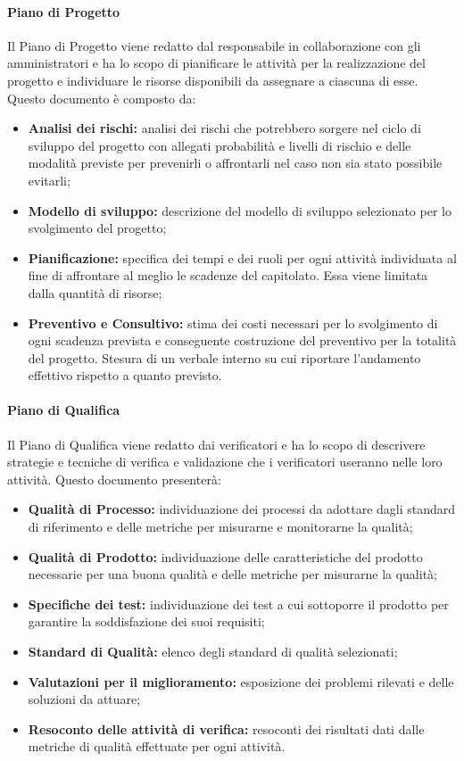 \paragraph{Piano di Progetto}
Il Piano di Progetto viene redatto dal responsabile in collaborazione con gli amministratori e ha lo scopo di pianificare le attività per la realizzazione del progetto e individuare le risorse disponibili da assegnare a ciascuna di esse.
Questo documento è composto da:
\begin{itemize}
	\item \textbf{Analisi dei rischi:} analisi dei rischi che potrebbero sorgere nel ciclo di sviluppo del progetto con allegati probabilità e livelli di rischio e delle modalità previste per prevenirli o affrontarli nel caso non sia stato possibile evitarli;
	\item \textbf{Modello di sviluppo\glo:} descrizione del modello di sviluppo selezionato per lo svolgimento del progetto;
	\item \textbf{Pianificazione:} specifica dei tempi e dei ruoli per ogni attività individuata al fine di affrontare al meglio le scadenze del capitolato. Essa viene limitata dalla quantità di risorse;
	\item \textbf{Preventivo e Consultivo:} stima dei costi necessari per lo svolgimento di ogni scadenza prevista e conseguente costruzione del preventivo per la totalità del progetto. Stesura di un verbale interno su cui riportare l'andamento effettivo rispetto a quanto previsto.
\end{itemize}
\paragraph{Piano di Qualifica}
Il Piano di Qualifica viene redatto dai verificatori e ha lo scopo di descrivere strategie e tecniche di verifica e validazione che i verificatori useranno nelle loro attività.
Questo documento presenterà:
\begin{itemize}
	\item \textbf{Qualità di Processo:} individuazione dei processi da adottare dagli standard di riferimento e delle metriche per misurarne e monitorarne la qualità;
	\item \textbf{Qualità di Prodotto:} individuazione delle caratteristiche del prodotto necessarie per una buona qualità e delle metriche per misurarne la qualità;
	\item \textbf{Specifiche dei test:} individuazione dei test a cui sottoporre il prodotto per garantire la soddisfazione dei suoi requisiti;
	\item \textbf{Standard di Qualità:} elenco degli standard di qualità selezionati;
	\item \textbf{Valutazioni per il miglioramento:} esposizione dei problemi rilevati e delle soluzioni da attuare;
	\item \textbf{Resoconto delle attività di verifica:} resoconti dei risultati dati dalle metriche di qualità effettuate per ogni attività.
\end{itemize}

